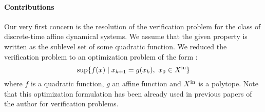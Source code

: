 \documentclass[10pt]{article}
\begin{document}



\paragraph{Contributions}
Our very first concern is the resolution of the verification problem for the class of discrete-time affine dynamical systems. We assume that the given property is written as the sublevel set of some quadratic function. 
We reduced the verification problem to an optimization problem of the form :
\begin{equation}
\label{eqintro}
\sup\{f(x)\mid x_{k+1}=g(x_k),\ x_0\in X^\mathrm{in}\}
\end{equation}
where $f$ is a quadratic function, $g$ an affine function and $X^\mathrm{in}$ is a polytope.
Note that this optimization formulation has been already used in previous papers of the author for verification problems. 
\end{document}
